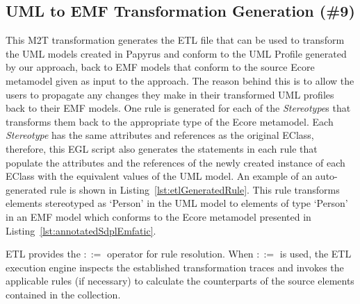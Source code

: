 \subsection{UML to EMF Transformation Generation (\#9)}
\label{sec:uml2emf}


This M2T transformation generates the ETL file that can be used to transform the UML models created in Papyrus and conform to the UML Profile generated by our approach, back to EMF models that conform to the source Ecore metamodel given as input to the approach. 
The reason behind this is to allow the users to propagate any changes they make in their transformed UML profiles back to their EMF models.
One rule is generated for each of the \textit{Stereotype}s that transforms them back to the appropriate type of the Ecore metamodel. 
Each \textit{Stereotype} has the same attributes and references as the original EClass, therefore, this EGL script also generates the statements in each rule that populate the attributes and the references of the newly created instance of each EClass with the equivalent values of the UML model. 
An example of an auto-generated rule is shown in Listing~\ref{lst:etlGeneratedRule}. 
This rule transforms elements stereotyped as `Person' in the UML model to elements of type `Person' in an EMF model which conforms to the Ecore metamodel presented in Listing~\ref{lst:annotatedSdplEmfatic}.



ETL provides the $::=$ operator for rule resolution. 
When $::=$ is used, the ETL execution engine inspects the established transformation traces and invokes the applicable rules (if necessary) to calculate the counterparts of the source elements contained in the collection. 

